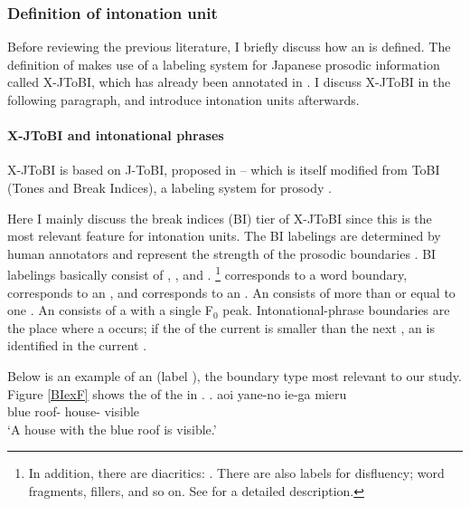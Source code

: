 \subsubsection{Definition of intonation unit}

Before reviewing the previous literature,
I briefly discuss how an  is defined.
The definition of  makes use of a labeling system for Japanese prosodic information called X-JToBI,
which has already been annotated in .
I discuss X-JToBI in the following paragraph, and introduce intonation units afterwards. 

\paragraph{X-JToBI and intonational phrases}

X-JToBI \cite{maekawaetal02,igarashietal06} is based on J-ToBI, proposed in  --
which is itself modified from ToBI (Tones and Break Indices), a labeling system for  prosody \cite{silvermanetal92,pitrellietal94,beckmanelam97}.%

Here I mainly discuss the break indices (BI) tier of X-JToBI
since this is the most relevant feature for intonation units.
The BI labelings are determined by human annotators and represent the strength of the prosodic boundaries \cite{maekawaetal02,igarashietal06}.
BI labelings basically consist of , , and .%
	\footnote{
	In addition, there are diacritics: .
	There are also labels for disfluency;
	word fragments, fillers, and so on.
	See  for a detailed description.
	}
 corresponds to a word boundary,
 corresponds to an , and
 corresponds to an .
An  consists of more than or equal to one .
An  consists of a  with a single F$_{0}$ peak.
Intonational-phrase boundaries are the place where a  occurs;
if the  of the current  is smaller than the next ,
an  is identified in the current .

Below is an example of an  (label ),
the boundary type most relevant to our study.
Figure \ref{BIexF} shows the  of the  in \Next.
%
\exg. aoi yane-no ie-ga mieru \\
	blue roof- house- visible \\
	`A house with the blue roof is visible.'

